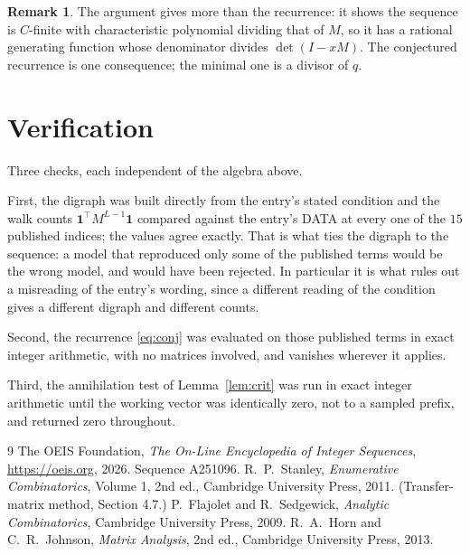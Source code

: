 \documentclass[11pt,a4paper]{article}
\theoremstyle{plain}
\theoremstyle{definition}
\newtheorem{remark}[theorem]{Remark}
\begin{document}
\begin{remark}
The argument gives more than the recurrence: it shows the sequence is $C$-finite with
characteristic polynomial dividing that of $M$, so it has a rational generating function
whose denominator divides $\det(I-xM)$. The conjectured recurrence is one consequence; the
minimal one is a divisor of $q$.
\end{remark}

\section{Verification}

Three checks, each independent of the algebra above.

First, the digraph was built directly from the entry's stated condition and the walk counts
$\mathbf{1}^{\!\top}M^{L-1}\mathbf{1}$ compared against the entry's DATA at
every one of the $15$ published indices; the values agree exactly. That is what ties
the digraph to the sequence: a model that reproduced only some of the published terms would
be the wrong model, and would have been rejected. In particular it is what rules out a
misreading of the entry's wording, since a different reading of the condition gives a
different digraph and different counts.

Second, the recurrence \eqref{eq:conj} was evaluated on those published terms in exact
integer arithmetic, with no matrices involved, and vanishes wherever it applies.

Third, the annihilation test of Lemma~\ref{lem:crit} was run in exact integer arithmetic
until the working vector was identically zero, not to a sampled prefix, and returned zero
throughout.

\begin{thebibliography}{9}
 The OEIS Foundation, \emph{The On-Line Encyclopedia of Integer
Sequences}, \url{https://oeis.org}, 2026. Sequence A251096.
 R.~P.~Stanley, \emph{Enumerative Combinatorics}, Volume 1, 2nd ed.,
Cambridge University Press, 2011. (Transfer-matrix method, Section 4.7.)
 P.~Flajolet and R.~Sedgewick, \emph{Analytic Combinatorics}, Cambridge
University Press, 2009.
 R.~A.~Horn and C.~R.~Johnson, \emph{Matrix Analysis}, 2nd ed., Cambridge
University Press, 2013.
\end{thebibliography}
\end{document}
